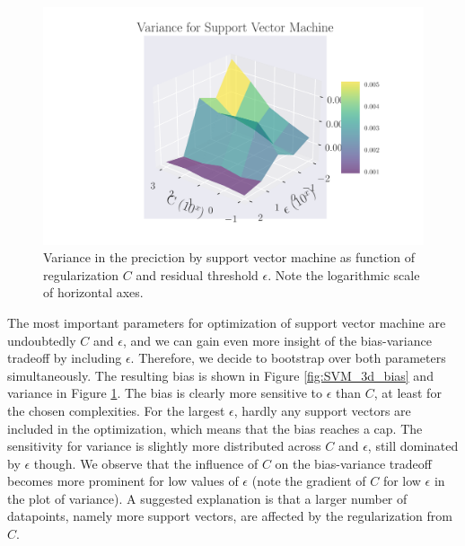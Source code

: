 \documentclass[a4paper]{article}
\begin{document}
	\begin{figure}[h]
		\centering
		\includegraphics[scale=0.7]{../output_extra/plots/var_SVM_C5_eps5.pdf}
		\caption{Variance in the preciction by support vector machine as function of regularization $C$ and residual threshold $\epsilon$. Note the logarithmic scale of horizontal axes.}
		\label{fig:SVM_3d_var}
	\end{figure}
	
	The most important parameters for optimization of support vector machine are undoubtedly $C$ and $\epsilon$, and we can gain even more insight of the bias-variance tradeoff by including $\epsilon$. Therefore, we decide to bootstrap over both parameters simultaneously. The resulting bias is shown in Figure \ref{fig:SVM_3d_bias} and variance in Figure \ref{fig:SVM_3d_var}. The bias is clearly more sensitive to $\epsilon$ than $C$, at least for the chosen complexities. For the largest $\epsilon$, hardly any support vectors are included in the optimization, which means that the bias reaches a cap. 
	The sensitivity for variance is slightly more distributed across $C$ and $\epsilon$, still dominated by $\epsilon$ though. We observe that the influence of $C$ on the bias-variance tradeoff becomes more prominent for low values of $\epsilon$ (note the gradient of $C$ for low $\epsilon$ in the plot of variance). A suggested explanation is that a larger number of datapoints, namely more support vectors, are affected by the regularization from $C$.
	
	
\end{document}
